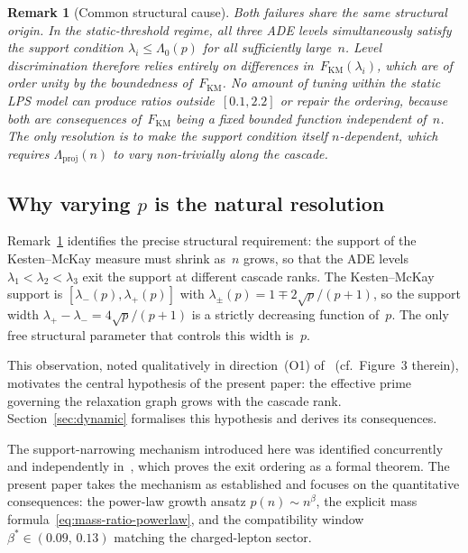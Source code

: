 \documentclass[11pt,a4paper]{article}
\newtheorem{remark}[theorem]{Remark}
\newcommand{\Lproj}{\Lambda_{\mathrm{proj}}}
\newcommand{\lpm}{\lambda_{\pm}}
\newcommand{\FKM}{F_{\mathrm{KM}}}
\begin{document}
      \begin{remark}[Common structural cause]
        \label{rem:common-cause}
        Both failures share the same structural origin.
        In the static-threshold regime, all three ADE levels simultaneously satisfy
        the support condition $\lambda_{i}\leq\Lambda_{0}(p)$ for all sufficiently large~$n$.
        Level discrimination therefore relies entirely on differences in~$\FKM(\lambda_{i})$,
        which are of order unity by the boundedness of~$\FKM$.
        No amount of tuning within the static LPS model can produce ratios
        outside~$[0.1,2.2]$ or repair the ordering, because both are consequences
        of~$\FKM$ being a fixed bounded function independent of~$n$.
        The only resolution is to make the support condition itself $n$-dependent,
        which requires $\Lproj(n)$ to vary non-trivially along the cascade.
      \end{remark}

    \subsection{Why varying $p$ is the natural resolution}
      \label{subsec:why-p}

      Remark~\ref{rem:common-cause} identifies the precise structural requirement:
      the support of the Kesten--McKay measure must shrink as~$n$ grows,
      so that the ADE levels $\lambda_{1}<\lambda_{2}<\lambda_{3}$ exit the support
      at different cascade ranks.
      The Kesten--McKay support is $[\lambda_{-}(p),\lambda_{+}(p)]$
      with $\lpm(p) = 1\mp 2\sqrt{p}/(p+1)$, so the support width
      $\lambda_{+}-\lambda_{-} = 4\sqrt{p}/(p+1)$ is a strictly decreasing function of~$p$.
      The only free structural parameter that controls this width is~$p$.

      This observation, noted qualitatively in direction~(O1) of~\cite{Beau2026a5}
      (cf.\ Figure~3 therein), motivates the central hypothesis of the present paper:
      the effective prime governing the relaxation graph grows with the cascade rank.
      Section~\ref{sec:dynamic} formalises this hypothesis and derives its consequences.

      The support-narrowing mechanism introduced here was identified concurrently
      and independently in~\cite{Beau2026a6}, which proves the exit ordering
      as a formal theorem.
      The present paper takes the mechanism as established and focuses on
      the quantitative consequences: the power-law growth ansatz $p(n)\sim n^\beta$,
      the explicit mass formula~\eqref{eq:mass-ratio-powerlaw}, and the
      compatibility window $\beta^{*}\in(0.09,\,0.13)$ matching the charged-lepton sector.
\end{document}
